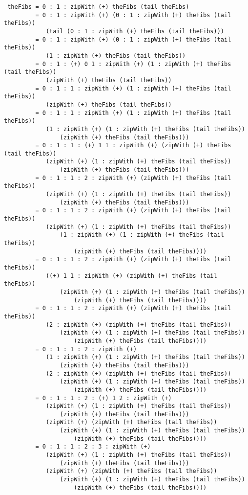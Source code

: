 \begin{verbatim}
 theFibs = 0 : 1 : zipWith (+) theFibs (tail theFibs)
         = 0 : 1 : zipWith (+) (0 : 1 : zipWith (+) theFibs (tail theFibs)) 
            (tail (0 : 1 : zipWith (+) theFibs (tail theFibs)))
         = 0 : 1 : zipWith (+) (0 : 1 : zipWith (+) theFibs (tail theFibs)) 
            (1 : zipWith (+) theFibs (tail theFibs))
         = 0 : 1 : (+) 0 1 : zipWith (+) (1 : zipWith (+) theFibs (tail theFibs)) 
            (zipWith (+) theFibs (tail theFibs))
         = 0 : 1 : 1 : zipWith (+) (1 : zipWith (+) theFibs (tail theFibs)) 
            (zipWith (+) theFibs (tail theFibs))
         = 0 : 1 : 1 : zipWith (+) (1 : zipWith (+) theFibs (tail theFibs)) 
            (1 : zipWith (+) (1 : zipWith (+) theFibs (tail theFibs)) 
                (zipWith (+) theFibs (tail theFibs)))
         = 0 : 1 : 1 : (+) 1 1 : zipWith (+) (zipWith (+) theFibs (tail theFibs)) 
            (zipWith (+) (1 : zipWith (+) theFibs (tail theFibs)) 
                (zipWith (+) theFibs (tail theFibs)))
         = 0 : 1 : 1 : 2 : zipWith (+) (zipWith (+) theFibs (tail theFibs)) 
            (zipWith (+) (1 : zipWith (+) theFibs (tail theFibs)) 
                (zipWith (+) theFibs (tail theFibs)))
         = 0 : 1 : 1 : 2 : zipWith (+) (zipWith (+) theFibs (tail theFibs)) 
            (zipWith (+) (1 : zipWith (+) theFibs (tail theFibs)) 
                (1 : zipWith (+) (1 : zipWith (+) theFibs (tail theFibs)) 
                    (zipWith (+) theFibs (tail theFibs))))
         = 0 : 1 : 1 : 2 : zipWith (+) (zipWith (+) theFibs (tail theFibs)) 
            ((+) 1 1 : zipWith (+) (zipWith (+) theFibs (tail theFibs)) 
                (zipWith (+) (1 : zipWith (+) theFibs (tail theFibs)) 
                    (zipWith (+) theFibs (tail theFibs))))
         = 0 : 1 : 1 : 2 : zipWith (+) (zipWith (+) theFibs (tail theFibs)) 
            (2 : zipWith (+) (zipWith (+) theFibs (tail theFibs)) 
                (zipWith (+) (1 : zipWith (+) theFibs (tail theFibs)) 
                    (zipWith (+) theFibs (tail theFibs))))
         = 0 : 1 : 1 : 2 : zipWith (+) 
            (1 : zipWith (+) (1 : zipWith (+) theFibs (tail theFibs)) 
                (zipWith (+) theFibs (tail theFibs)))
            (2 : zipWith (+) (zipWith (+) theFibs (tail theFibs)) 
                (zipWith (+) (1 : zipWith (+) theFibs (tail theFibs)) 
                    (zipWith (+) theFibs (tail theFibs))))
         = 0 : 1 : 1 : 2 : (+) 1 2 : zipWith (+) 
            (zipWith (+) (1 : zipWith (+) theFibs (tail theFibs)) 
                (zipWith (+) theFibs (tail theFibs)))
            (zipWith (+) (zipWith (+) theFibs (tail theFibs)) 
                (zipWith (+) (1 : zipWith (+) theFibs (tail theFibs)) 
                    (zipWith (+) theFibs (tail theFibs))))
         = 0 : 1 : 1 : 2 : 3 : zipWith (+) 
            (zipWith (+) (1 : zipWith (+) theFibs (tail theFibs)) 
                (zipWith (+) theFibs (tail theFibs)))
            (zipWith (+) (zipWith (+) theFibs (tail theFibs)) 
                (zipWith (+) (1 : zipWith (+) theFibs (tail theFibs)) 
                    (zipWith (+) theFibs (tail theFibs))))
\end{verbatim}

